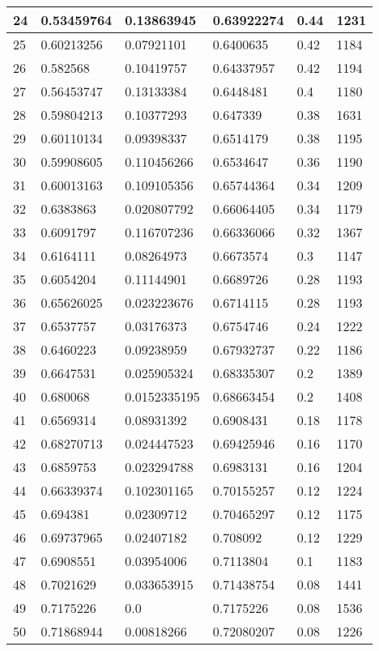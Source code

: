 \begin{longtable}{|l|l|l|l|l|l|}
24 & 0.53459764 & 0.13863945 & 0.63922274 & 0.44 & 1231 \\ \hline 
25 & 0.60213256 & 0.07921101 & 0.6400635 & 0.42 & 1184 \\ \hline 
26 & 0.582568 & 0.10419757 & 0.64337957 & 0.42 & 1194 \\ \hline 
27 & 0.56453747 & 0.13133384 & 0.6448481 & 0.4 & 1180 \\ \hline 
28 & 0.59804213 & 0.10377293 & 0.647339 & 0.38 & 1631 \\ \hline 
29 & 0.60110134 & 0.09398337 & 0.6514179 & 0.38 & 1195 \\ \hline 
30 & 0.59908605 & 0.110456266 & 0.6534647 & 0.36 & 1190 \\ \hline 
31 & 0.60013163 & 0.109105356 & 0.65744364 & 0.34 & 1209 \\ \hline 
32 & 0.6383863 & 0.020807792 & 0.66064405 & 0.34 & 1179 \\ \hline 
33 & 0.6091797 & 0.116707236 & 0.66336066 & 0.32 & 1367 \\ \hline 
34 & 0.6164111 & 0.08264973 & 0.6673574 & 0.3 & 1147 \\ \hline 
35 & 0.6054204 & 0.11144901 & 0.6689726 & 0.28 & 1193 \\ \hline 
36 & 0.65626025 & 0.023223676 & 0.6714115 & 0.28 & 1193 \\ \hline 
37 & 0.6537757 & 0.03176373 & 0.6754746 & 0.24 & 1222 \\ \hline 
38 & 0.6460223 & 0.09238959 & 0.67932737 & 0.22 & 1186 \\ \hline 
39 & 0.6647531 & 0.025905324 & 0.68335307 & 0.2 & 1389 \\ \hline 
40 & 0.680068 & 0.0152335195 & 0.68663454 & 0.2 & 1408 \\ \hline 
41 & 0.6569314 & 0.08931392 & 0.6908431 & 0.18 & 1178 \\ \hline 
42 & 0.68270713 & 0.024447523 & 0.69425946 & 0.16 & 1170 \\ \hline 
43 & 0.6859753 & 0.023294788 & 0.6983131 & 0.16 & 1204 \\ \hline 
44 & 0.66339374 & 0.102301165 & 0.70155257 & 0.12 & 1224 \\ \hline 
45 & 0.694381 & 0.02309712 & 0.70465297 & 0.12 & 1175 \\ \hline 
46 & 0.69737965 & 0.02407182 & 0.708092 & 0.12 & 1229 \\ \hline 
47 & 0.6908551 & 0.03954006 & 0.7113804 & 0.1 & 1183 \\ \hline 
48 & 0.7021629 & 0.033653915 & 0.71438754 & 0.08 & 1441 \\ \hline 
49 & 0.7175226 & 0.0 & 0.7175226 & 0.08 & 1536 \\ \hline 
50 & 0.71868944 & 0.00818266 & 0.72080207 & 0.08 & 1226 \\ \hline 
\end{longtable}